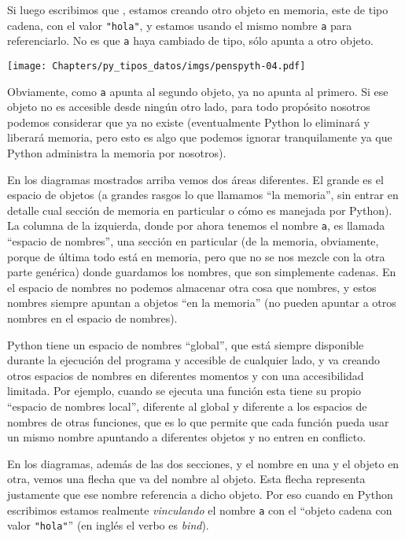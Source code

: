 Si luego escribimos que , estamos creando otro objeto en memoria, este de tipo cadena, con el valor \verb|"hola"|, y estamos usando el mismo nombre \verb|a| para referenciarlo. No es que \verb|a| haya cambiado de tipo, sólo apunta a otro objeto.

\begin{center}
    \texttt{[image: Chapters/py\_tipos\_datos/imgs/penspyth-04.pdf]}
\end{center}

Obviamente, como \verb|a| apunta al segundo objeto, ya no apunta al primero. Si ese objeto no es accesible desde ningún otro lado, para todo propósito nosotros podemos considerar que ya no existe (eventualmente Python lo eliminará y liberará memoria, pero esto es algo que podemos ignorar tranquilamente ya que Python administra la memoria por nosotros).

En los diagramas mostrados arriba vemos dos áreas diferentes. El grande es el espacio de objetos (a grandes rasgos lo que llamamos ``la memoria'', sin entrar en detalle cual sección de memoria en particular o cómo es manejada por Python). La columna de la izquierda, donde por ahora tenemos el nombre \verb|a|, es llamada ``espacio de nombres'', una sección en particular (de la memoria, obviamente, porque de última todo está en memoria, pero que no se nos mezcle con la otra parte genérica) donde guardamos los nombres, que son simplemente cadenas. En el espacio de nombres no podemos almacenar otra cosa que nombres, y estos nombres siempre apuntan a objetos ``en la memoria'' (no pueden apuntar a otros nombres en el espacio de nombres).

Python tiene un espacio de nombres ``global'', que está siempre disponible durante la ejecución del programa y accesible de cualquier lado, y va creando otros espacios de nombres en diferentes momentos y con una accesibilidad limitada. Por ejemplo, cuando se ejecuta una función esta tiene su propio ``espacio de nombres local'', diferente al global y diferente a los espacios de nombres de otras funciones, que es lo que permite que cada función pueda usar un mismo nombre apuntando a diferentes objetos y no entren en conflicto. 

En los diagramas, además de las dos secciones, y el nombre en una y el objeto en otra, vemos una flecha que va del nombre al objeto. Esta flecha representa justamente que ese nombre referencia a dicho objeto. Por eso cuando en Python escribimos  estamos realmente \textit{vinculando} el nombre \verb|a| con el ``objeto cadena con valor \verb|"hola"|'' (en inglés el verbo es \textit{bind}).

